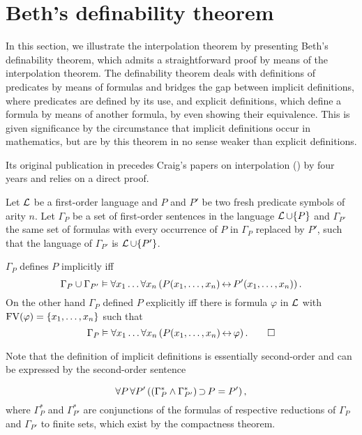 

\section{Beth's definability theorem}
\label{sec:beth}

In this section, we illustrate the interpolation theorem by presenting Beth's definability theorem, which admits a straightforward proof by means of the interpolation theorem. 
The definability theorem deals with definitions of predicates by means of formulas and bridges the gap between implicit definitions, where predicates are defined by its use, and explicit definitions, which define a formula by means of another formula, by even showing their equivalence.
This is given significance by the circumstance that implicit definitions occur in mathematics, but are by this theorem in no sense weaker than explicit definitions.

Its original publication in \cite{beth1953} precedes Craig's papers on interpolation (\cite{Craig57linear,Craig57three}) by four years and relies on a direct proof.
 

\begin{defi}
	Let $\operatorname{\mathcal{L}}$ be a first-order language and
	$P$ and $P'$ be two fresh predicate symbols of arity $n$.
	Let $\Gamma_P$ be a set of first-order sentences
	in the language $\operatorname{\mathcal{L}}\cup\{P\}$ 
	and $\Gamma_{P'}$ the same set of formulas with every occurrence of $P$ in $\Gamma_P$ replaced by\nolinebreak{} $P'$, such that the language of $\Gamma_{P'}$ is $\operatorname{\mathcal{L}} \cup\{P'\}$.

	$\Gamma_P$ defines $P$ implicitly iff
	\[\Gamma_P \cup \Gamma_{P'} \vDash \forall x_1\dots \forall x_n \left(  P(x_1, \dots, x_n) \operatorname{\leftrightarrow} P'(x_1, \dots, x_n)\right).\]
	On the other hand $\Gamma_P$ defined $P$ explicitly iff there is formula $\varphi$ in $\operatorname{\mathcal{L}}$ with $\operatorname{FV}(\varphi) = \{x_1, \dots, x_n\}$ such that 
	\[\Gamma_P\vDash \forall x_1\dots \forall x_n \left(  P(x_1, \dots, x_n) \operatorname{\leftrightarrow} \varphi\right).\qedhere\]
\end{defi}

Note that the definition of implicit definitions is essentially second-order 
and 
can be expressed by the second-order sentence
\begin{samepage}
\[ \forall P\,\forall P' \left(  \left(\Gamma^*_P \land \Gamma^*_{P'} \right) \operatorname{\supset} P=P'\right),\] 
where $\Gamma^*_P$ and $\Gamma^*_{P'}$ are conjunctions of the formulas of 
respective reductions of $\Gamma_P$ and $\Gamma_{P'}$ 
to finite sets, which exist by the compactness theorem.
\end{samepage}

